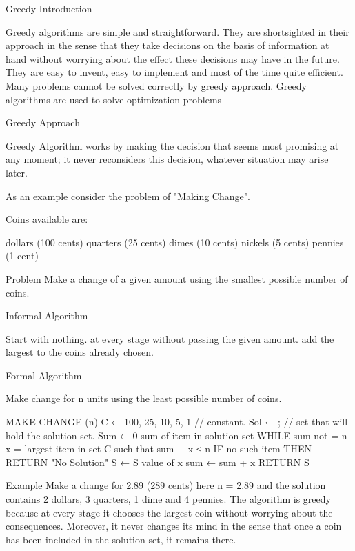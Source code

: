 
Greedy Introduction



 

Greedy algorithms are simple and straightforward. They are shortsighted in their approach in the sense that they take decisions on the basis of information at hand without worrying about the effect these decisions may have in the future. They are easy to invent, easy to implement and most of the time quite efficient. Many problems cannot be solved correctly by greedy approach. Greedy algorithms are used to solve optimization problems

Greedy Approach

Greedy Algorithm works by making the decision that seems most promising at any moment; it never reconsiders this decision, whatever situation may arise later.

As an example consider the problem of "Making Change".

Coins available are:

dollars (100 cents)
quarters (25 cents)
dimes (10 cents)
nickels (5 cents)
pennies (1 cent)
 

Problem    Make a change of a given amount using the smallest possible number of coins.

 

Informal Algorithm

Start with nothing.
at every stage without passing the given amount.
add the largest to the coins already chosen.
 

Formal Algorithm

Make change for n units using the least possible number of coins.

MAKE-CHANGE (n)
        C ← {100, 25, 10, 5, 1}     // constant.
        Sol ← {};                         // set that will hold the solution set.
        Sum ← 0 sum of item in solution set
        WHILE sum not = n
            x = largest item in set C such that sum + x ≤ n
            IF no such item THEN
                RETURN    "No Solution"
            S ← S {value of x}
            sum ← sum + x
        RETURN S

 

Example     Make a change for 2.89 (289 cents) here n = 2.89 and the solution contains 2 dollars, 3 quarters, 1 dime and 4 pennies. The algorithm is greedy because at every stage it chooses the largest coin without worrying about the consequences. Moreover, it never changes its mind in the sense that once a coin has been included in the solution set, it remains there.


